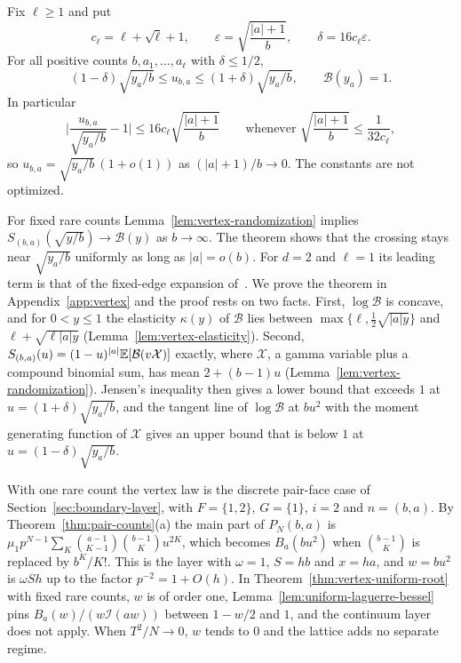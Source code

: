 \begin{theorem}\label{thm:vertex-uniform-root}
Fix $\ell\ge1$ and put
\[
 c_\ell=\ell+\sqrt\ell+1,\qquad
 \varepsilon=\sqrt{\frac{|a|+1}{b}},\qquad \delta=16c_\ell\varepsilon.
\]
For all positive counts $b,a_1,\ldots,a_\ell$ with $\delta\le1/2$,
\begin{equation}\label{eq:vertex-uniform-bracket}
 (1-\delta)\sqrt{y_a/b}\le u_{b,a}\le
 (1+\delta)\sqrt{y_a/b},\qquad \mathcal B(y_a)=1.
\end{equation}
In particular
\begin{equation}\label{eq:vertex-uniform-root}
 \biggl|\frac{u_{b,a}}{\sqrt{y_a/b}}-1\biggr|\le16c_\ell\sqrt{\frac{|a|+1}{b}}
 \qquad\text{whenever }\sqrt{\frac{|a|+1}{b}}\le\frac1{32c_\ell},
\end{equation}
so $u_{b,a}=\sqrt{y_a/b}\,(1+o(1))$ as $(|a|+1)/b\to0$. The constants are not
optimized.
\end{theorem}

For fixed rare counts Lemma~\ref{lem:vertex-randomization} implies
$S_{(b,a)}(\sqrt{y/b})\to\mathcal B(y)$ as $b\to\infty$. The theorem shows that the crossing
stays near $\sqrt{y_a/b}$ uniformly as long as $|a|=o(b)$. For $d=2$ and $\ell=1$ its leading
term is that of the fixed-edge expansion of~\cite[Theorem~4.10]{paperA}. We prove the theorem in
Appendix~\ref{app:vertex} and the proof rests on two facts. First, $\log\mathcal B$ is concave, and for
$0<y\le1$ the elasticity $\kappa(y)$ of $\mathcal B$ lies between $\max\{\ell,\frac12\sqrt{|a|y}\}$ and $\ell+\sqrt{\ell|a|y}$
(Lemma~\ref{lem:vertex-elasticity}). Second, $S_{(b,a)}(u)=(1-u)^{|a|}\mathbb{E}[\mathcal B(v\mathcal X)]$
exactly, where $\mathcal X$, a gamma variable plus a compound binomial sum, has mean
$2+(b-1)u$ (Lemma~\ref{lem:vertex-randomization}). Jensen's inequality then gives a lower bound
that exceeds $1$ at $u=(1+\delta)\sqrt{y_a/b}$, and the tangent line of $\log\mathcal B$ at
$bu^2$ with the moment generating function of $\mathcal X$ gives an upper bound that is below
$1$ at $u=(1-\delta)\sqrt{y_a/b}$.

With one rare count the vertex law is the discrete pair-face case of
Section~\ref{sec:boundary-layer}, with $F=\{1,2\}$, $G=\{1\}$, $i=2$ and $n=(b,a)$. By
Theorem~\ref{thm:pair-counts}(a) the main part of $P_N(b,a)$ is
$\mu_1p^{N-1}\sum_K\binom{a-1}{K-1}\binom{b-1}Ku^{2K}$, which becomes $B_a(bu^2)$ when
$\binom{b-1}K$ is replaced by $b^K/K!$. This is the layer with $\omega=1$, $S=hb$ and $x=ha$,
and $w=bu^2$ is $\omega Sh$ up to the factor $p^{-2}=1+O(h)$. In
Theorem~\ref{thm:vertex-uniform-root} with fixed rare counts, $w$ is of order one, Lemma~\ref{lem:uniform-laguerre-bessel}
pins $B_a(w)/(w\mathcal I(aw))$ between $1-w/2$ and $1$, and the continuum layer does not apply.
When $T^2/N\to0$, $w$ tends to $0$ and the lattice adds no separate regime.
